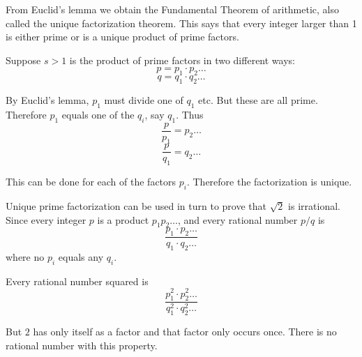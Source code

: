 \documentclass[11pt, oneside]{article}
\begin{document}
From Euclid's lemma we obtain the Fundamental Theorem of arithmetic, also called the unique factorization theorem.  This says that every integer larger than 1 is either prime or is a unique product of prime factors.

Suppose $s > 1$ is the product of prime factors in two different ways:
\[ p = p_1 \cdot p_2 \dots \]
\[ q = q_1 \cdot q_2 \dots \]

By Euclid's lemma, $p_1$ must divide one of $q_1$ etc.  But these are all prime.  Therefore $p_1$ equals one of the $q_i$, say $q_1$.  Thus
\[ \frac{p}{p_1} = p_2 \dots \]
\[ \frac{p}{q_1} = q_2 \dots \]

This can be done for each of the factors $p_i$.  Therefore the factorization is unique.

Unique prime factorization can be used in turn to prove that $\sqrt{2}$ is irrational.  Since every integer $p$ is a product $p_1 p_2 \dots$, and every rational number $p/q$ is
\[ \frac{p_1 \cdot p_2 \dots}{q_1 \cdot q_2 \dots} \]
where no $p_i$ equals any $q_i$.

Every rational number squared is 
\[ \frac{p_1^2 \cdot p_2^2 \dots}{q_1^2 \cdot q_2^2 \dots} \]

But $2$ has only itself as a factor and that factor only occurs once.  There is no rational number with this property.
\end{document}
